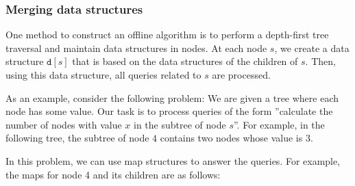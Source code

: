 \subsubsection{Merging data structures}

One method to construct an offline algorithm
is to perform a depth-first tree traversal
and maintain data structures in nodes.
At each node $s$, we create a data structure
$\texttt{d}[s]$ that is based on the
data structures of the children of $s$.
Then, using this data structure,
all queries related to $s$ are processed.

As an example, consider the following problem:
We are given a tree where each node has some value.
Our task is to process queries of the form
''calculate the number of nodes with value $x$
in the subtree of node $s$''.
For example, in the following tree,
the subtree of node $4$ contains two nodes
whose value is 3.

\begin{center}
\end{center}

In this problem, we can use map structures
to answer the queries.
For example, the maps for node 4 and
its children are as follows:

